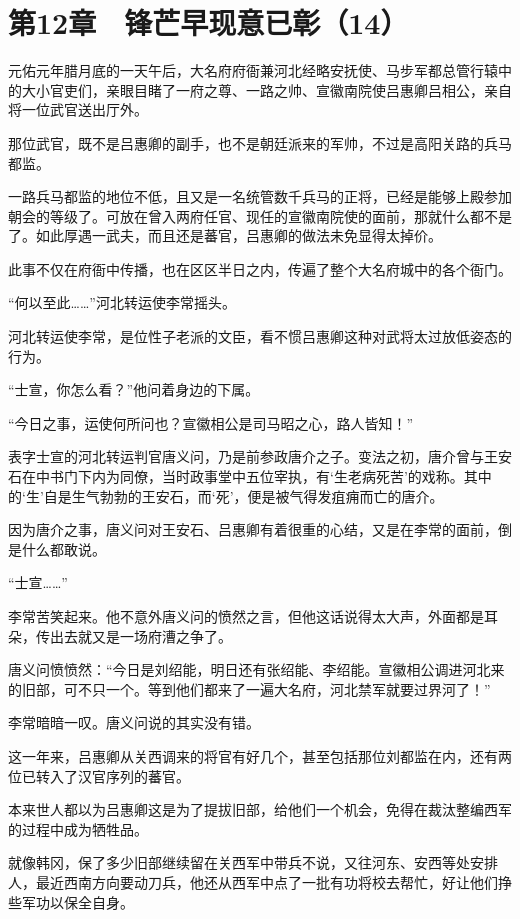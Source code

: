 \section{第12章　锋芒早现意已彰（14）}

元佑元年腊月底的一天午后，大名府府衙兼河北经略安抚使、马步军都总管行辕中的大小官吏们，亲眼目睹了一府之尊、一路之帅、宣徽南院使吕惠卿吕相公，亲自将一位武官送出厅外。

那位武官，既不是吕惠卿的副手，也不是朝廷派来的军帅，不过是高阳关路的兵马都监。

一路兵马都监的地位不低，且又是一名统管数千兵马的正将，已经是能够上殿参加朝会的等级了。可放在曾入两府任官、现任的宣徽南院使的面前，那就什么都不是了。如此厚遇一武夫，而且还是蕃官，吕惠卿的做法未免显得太掉价。

此事不仅在府衙中传播，也在区区半日之内，传遍了整个大名府城中的各个衙门。

“何以至此……”河北转运使李常摇头。

河北转运使李常，是位性子老派的文臣，看不惯吕惠卿这种对武将太过放低姿态的行为。

“士宣，你怎么看？”他问着身边的下属。

“今日之事，运使何所问也？宣徽相公是司马昭之心，路人皆知！”

表字士宣的河北转运判官唐义问，乃是前参政唐介之子。变法之初，唐介曾与王安石在中书门下内为同僚，当时政事堂中五位宰执，有‘生老病死苦’的戏称。其中的‘生’自是生气勃勃的王安石，而‘死’，便是被气得发疽痈而亡的唐介。

因为唐介之事，唐义问对王安石、吕惠卿有着很重的心结，又是在李常的面前，倒是什么都敢说。

“士宣……”

李常苦笑起来。他不意外唐义问的愤然之言，但他这话说得太大声，外面都是耳朵，传出去就又是一场府漕之争了。

唐义问愤愤然：“今日是刘绍能，明日还有张绍能、李绍能。宣徽相公调进河北来的旧部，可不只一个。等到他们都来了一遍大名府，河北禁军就要过界河了！”

李常暗暗一叹。唐义问说的其实没有错。

这一年来，吕惠卿从关西调来的将官有好几个，甚至包括那位刘都监在内，还有两位已转入了汉官序列的蕃官。

本来世人都以为吕惠卿这是为了提拔旧部，给他们一个机会，免得在裁汰整编西军的过程中成为牺牲品。

就像韩冈，保了多少旧部继续留在关西军中带兵不说，又往河东、安西等处安排人，最近西南方向要动刀兵，他还从西军中点了一批有功将校去帮忙，好让他们挣些军功以保全自身。

